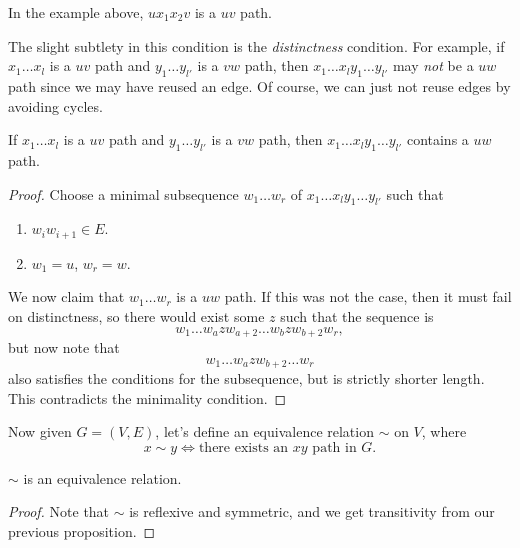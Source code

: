 In the example above, $u x_1 x_2 v$ is a $uv$ path. 

The slight subtlety in this condition is the \emph{distinctness} condition. For example, if $x_1 \dots x_l$ is a $uv$ path and $y_1 \dots y_{l'}$ is a $vw$ path, then $x_1 \dots x_l y_1 \dots y_{l'}$ may \emph{not} be a $uw$ path since we may have reused an edge. Of course, we can just not reuse edges by avoiding cycles.

\begin{proposition}
	If $x_1 \dots x_l$ is a $uv$ path and $y_1 \dots y_{l'}$ is a $vw$ path, then $x_1 \dots x_l y_1 \dots y_{l'}$ contains a $uw$ path.
\end{proposition}
\begin{proof}
	Choose a minimal subsequence $w_1 \dots w_r$ of $x_1 \dots x_l y_1 \dots y_{l'}$ such that
	\begin{enumerate}
		\item $w_i w_{i + 1} \in E$.
		\item $w_1 = u$, $w_r = w$.
	\end{enumerate}
	We now claim that $w_1 \dots w_r$ is a $uw$ path. If this was not the case, then it must fail on distinctness, so there would exist some $z$ such that the sequence is
	$$
	w_1 \dots w_{a} z w_{a + 2} \dots w_b z w_{b + 2} w_r,
	$$
	but now note that
	$$
	w_1 \dots w_{a}zw_{b+2} \dots w_r
	$$
	also satisfies the conditions for the subsequence, but is strictly shorter length. This contradicts the minimality condition.
\end{proof}

Now given $G = (V, E)$, let's define an equivalence relation $\sim$ on $V$, where
$$
x \sim y \iff \text{there exists an $xy$ path in $G$}.
$$

\begin{proposition}
	$\sim$ is an equivalence relation.
\end{proposition}
\begin{proof}
	Note that $\sim$ is reflexive and symmetric, and we get transitivity from our previous proposition.
\end{proof}


